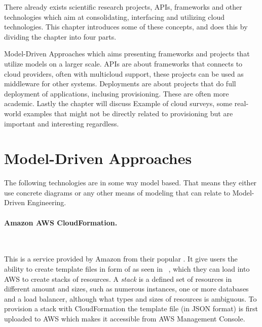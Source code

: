 
There already exists scientific research projects, APIs, frameworks 
and other technologies which aim at consolidating, interfacing and utilizing cloud technologies.
This chapter introduces some of these concepts, and does this by dividing the chapter into four parts.
\begin{ii}
  \iitem Model-Driven Approaches which aims presenting frameworks and projects that utilize
  models on a larger scale.
  \iitem APIs are about frameworks that connects to cloud providers, often with multicloud support,
  these projects can be used as middleware for other systems.
  \iitem Deployments are about projects that do full deployment of applications, inclusing provisioning.
  These are often more academic.
  Lastly the chapter will discuss \iitem Example of cloud surveys, some real-world examples
  that might not be directly related to provisioning but are important and interesting regardless.
\end{ii}

\section{Model-Driven Approaches}

The following technologies are in some way model based.
That means they either use concrete diagrams or any other means of
modeling that can relate to Model-Driven Engineering.

\paragraph{Amazon AWS CloudFormation.}~\cite{aws}



This is a service provided by Amazon from their popular .
It give users the ability to create template files in form of 
 as seen in ~, 
which they can load into AWS to create stacks of resources. 
A \emph{stack} is a defined set of resources in different amount and sizes, 
such as numerous instances,
one or more databases and a load balancer, although what types and sizes of resources is ambiguous.
To provision a stack with CloudFormation the template file (in JSON format) is first uploaded to
AWS which makes it accessible from AWS Management Console.

